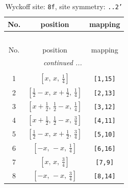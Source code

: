 \documentclass[fleqn,8pt]{jsarticle}
\begin{document}
\begin{longtable}{ccc}
\caption{Wyckoff site: {\tt 8f}, site symmetry: {\tt ..2'}}
 \\
 \hline \hline
No. & position & mapping \\ \hline \endfirsthead

\multicolumn{2}{l}{\tablename\ \thetable{}} \\
 \hline \hline
No. & position & mapping \\ \hline \endhead

 \hline \hline
\multicolumn{2}{r}{\footnotesize\it continued ...} \\ \endfoot

 \hline \hline
\multicolumn{2}{r}{} \\ \endlastfoot

1 & $\left[ x,\, x,\, \frac{1}{4} \right]$ & {\tt [1,15]} \\ \hline
2 & $\left[ \frac{1}{2} - x,\, x + \frac{1}{2},\, \frac{1}{4} \right]$ & {\tt [2,13]} \\ \hline
3 & $\left[ x + \frac{1}{2},\, \frac{1}{2} - x,\, \frac{1}{4} \right]$ & {\tt [3,12]} \\ \hline
4 & $\left[ x + \frac{1}{2},\, \frac{1}{2} - x,\, \frac{3}{4} \right]$ & {\tt [4,11]} \\ \hline
5 & $\left[ \frac{1}{2} - x,\, x + \frac{1}{2},\, \frac{3}{4} \right]$ & {\tt [5,10]} \\ \hline
6 & $\left[ - x,\, - x,\, \frac{1}{4} \right]$ & {\tt [6,16]} \\ \hline
7 & $\left[ x,\, x,\, \frac{3}{4} \right]$ & {\tt [7,9]} \\ \hline
8 & $\left[ - x,\, - x,\, \frac{3}{4} \right]$ & {\tt [8,14]} \\
\end{longtable}
\renewcommand{\arraystretch}{1.2}
\end{document}
